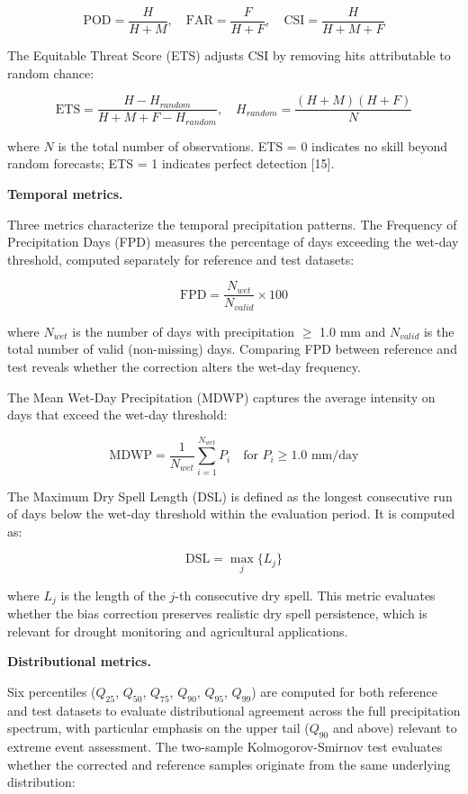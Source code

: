 \documentclass[
]{article}
\begin{document}
\[\text{POD} = \frac{H}{H + M}, \quad \text{FAR} = \frac{F}{H + F}, \quad \text{CSI} = \frac{H}{H + M + F}\]

The Equitable Threat Score (ETS) adjusts CSI by removing hits
attributable to random chance:

\[\text{ETS} = \frac{H - H_{random}}{H + M + F - H_{random}}, \quad H_{random} = \frac{(H + M)(H + F)}{N}\]

where \(N\) is the total number of observations. ETS = 0 indicates no
skill beyond random forecasts; ETS = 1 indicates perfect detection
{[}15{]}.

\textbf{Temporal metrics.}

Three metrics characterize the temporal precipitation patterns. The
Frequency of Precipitation Days (FPD) measures the percentage of days
exceeding the wet-day threshold, computed separately for reference and
test datasets:

\[\text{FPD} = \frac{N_{wet}}{N_{valid}} \times 100\]

where \(N_{wet}\) is the number of days with precipitation \(\geq\) 1.0
mm and \(N_{valid}\) is the total number of valid (non-missing) days.
Comparing FPD between reference and test reveals whether the correction
alters the wet-day frequency.

The Mean Wet-Day Precipitation (MDWP) captures the average intensity on
days that exceed the wet-day threshold:

\[\text{MDWP} = \frac{1}{N_{wet}} \sum_{i=1}^{N_{wet}} P_i \quad \text{for } P_i \geq 1.0 \text{ mm/day}\]

The Maximum Dry Spell Length (DSL) is defined as the longest consecutive
run of days below the wet-day threshold within the evaluation period. It
is computed as:

\[\text{DSL} = \max_{j} \{ L_j \}\]

where \(L_j\) is the length of the \(j\)-th consecutive dry spell. This
metric evaluates whether the bias correction preserves realistic dry
spell persistence, which is relevant for drought monitoring and
agricultural applications.

\textbf{Distributional metrics.}

Six percentiles (\(Q_{25}\), \(Q_{50}\), \(Q_{75}\), \(Q_{90}\),
\(Q_{95}\), \(Q_{99}\)) are computed for both reference and test
datasets to evaluate distributional agreement across the full
precipitation spectrum, with particular emphasis on the upper tail
(\(Q_{90}\) and above) relevant to extreme event assessment. The
two-sample Kolmogorov-Smirnov test evaluates whether the corrected and
reference samples originate from the same underlying distribution:
\end{document}
